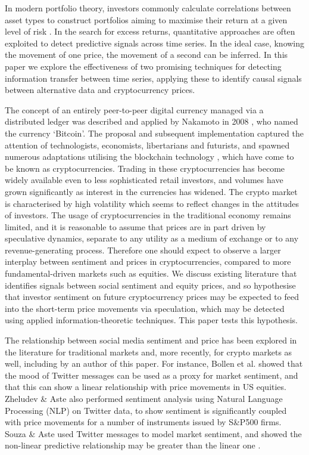 \documentclass[]{rsos}%
\begin{document}
  In modern portfolio theory, investors commonly calculate correlations between asset types to construct portfolios aiming to maximise their return at a given level of risk \cite{markowitz1952portfolio}. In the search for excess returns, quantitative approaches are often exploited to detect predictive signals across time series. In the ideal case,  knowing the movement of one price, the movement of a second can be inferred.  In this paper we explore the effectiveness of two promising techniques for detecting information transfer between time series, applying these to identify causal signals between alternative data and cryptocurrency prices. 

  The concept of an entirely peer-to-peer digital currency managed via a distributed ledger was described and applied by Nakamoto in 2008 \cite{nakamoto2008bitcoin}, who named the currency `Bitcoin'. The proposal and subsequent implementation captured the attention of technologists, economists, libertarians and futurists, and spawned numerous adaptations utilising the blockchain technology \cite{aste2017blockchain}, which have come to be known as cryptocurrencies. Trading in these cryptocurrencies has become widely available even to less sophisticated retail investors, and volumes have grown significantly as interest in the currencies has widened. The crypto market is characterised by high volatility which seems to reflect changes in the attitudes of investors. The usage of cryptocurrencies in the traditional economy remains limited, and it is reasonable to assume that prices are in part driven by speculative dynamics, separate to any utility as a medium of exchange or to any revenue-generating process. Therefore one should expect to observe a larger interplay between sentiment and prices in cryptocurrencies, compared to more fundamental-driven markets such as equities. We discuss existing literature that identifies signals between social sentiment and equity prices, and so hypothesise that investor sentiment on future cryptocurrency prices may be expected to feed into the short-term price movements via speculation, which may be detected using applied information-theoretic techniques. This paper tests this hypothesis. 

  The relationship between social media sentiment and price has been explored in the literature for traditional markets and, more recently, for crypto markets as well, including by an author of this paper. For instance, Bollen et al.  \cite{bollen2011twitter} showed that the mood of Twitter messages can be used as a proxy for market sentiment, and that this can show a linear relationship with price movements in US equities. Zheludev \& Aste \cite{zheludev2014can} also performed sentiment analysis using Natural Language Processing (NLP) on Twitter data, to show sentiment is significantly coupled with price movements for a number of instruments issued by S\&P500 firms. Souza \& Aste  used Twitter messages to model market sentiment, and showed the non-linear predictive relationship may be greater than the linear one \cite{souza2016nonlinear}. 
  
\end{document}
